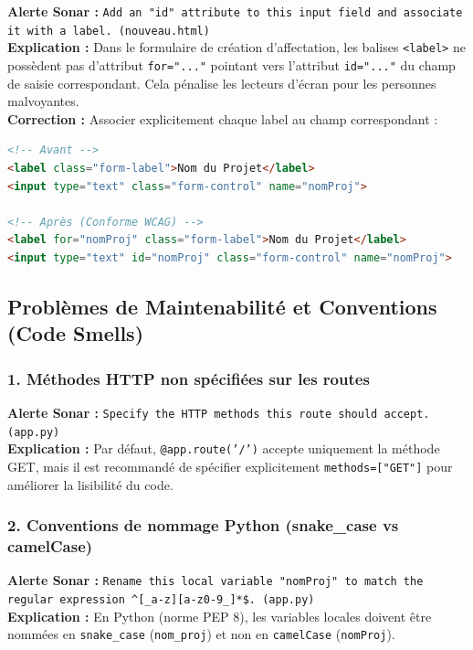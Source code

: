 \documentclass[12pt,a4paper]{article}
\begin{document}
\textbf{Alerte Sonar :} \texttt{Add an "id" attribute to this input field and associate it with a label. (nouveau.html)}\\
\textbf{Explication :} Dans le formulaire de création d'affectation, les balises \texttt{<label>} ne possèdent pas d'attribut \texttt{for="..."} pointant vers l'attribut \texttt{id="..."} du champ de saisie correspondant. Cela pénalise les lecteurs d'écran pour les personnes malvoyantes.\\
\textbf{Correction :} Associer explicitement chaque label au champ correspondant :
\begin{lstlisting}[language=HTML, caption=Correction de l'accessibilité dans le formulaire]
<!-- Avant -->
<label class="form-label">Nom du Projet</label>
<input type="text" class="form-control" name="nomProj">

<!-- Après (Conforme WCAG) -->
<label for="nomProj" class="form-label">Nom du Projet</label>
<input type="text" id="nomProj" class="form-control" name="nomProj">
\end{lstlisting}

\subsection{Problèmes de Maintenabilité et Conventions (Code Smells)}

\subsubsection{1. Méthodes HTTP non spécifiées sur les routes}
\textbf{Alerte Sonar :} \texttt{Specify the HTTP methods this route should accept. (app.py)}\\
\textbf{Explication :} Par défaut, \texttt{@app.route('/')} accepte uniquement la méthode GET, mais il est recommandé de spécifier explicitement \texttt{methods=["GET"]} pour améliorer la lisibilité du code.

\subsubsection{2. Conventions de nommage Python (snake\_case vs camelCase)}
\textbf{Alerte Sonar :} \texttt{Rename this local variable "nomProj" to match the regular expression \^{}[\_a-z][a-z0-9\_]*\$. (app.py)}\\
\textbf{Explication :} En Python (norme PEP 8), les variables locales doivent être nommées en \texttt{snake\_case} (\texttt{nom\_proj}) et non en \texttt{camelCase} (\texttt{nomProj}).
\end{document}
